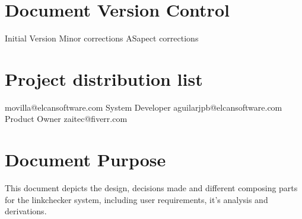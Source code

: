 \section{Document Version Control}
\begin{elcanversions}
	 {Initial Version}		
	 {Minor corrections}
	 {ASapect corrections}
\end{elcanversions}

\section{Project distribution list}

\begin{elcandistribution}

	 {movilla@elcansoftware.com} {\distribdate} 
	 {System Developer} {aguilarjpb@elcansoftware.com} {\distribdate}
	 {Product Owner} {zaitec@fiverr.com} {\distribdate}	
\end{elcandistribution}

\section{Document Purpose}
This document depicts the design, decisions made and different composing parts for the linkchecker system, including user requirements, it's analysis and derivations.

